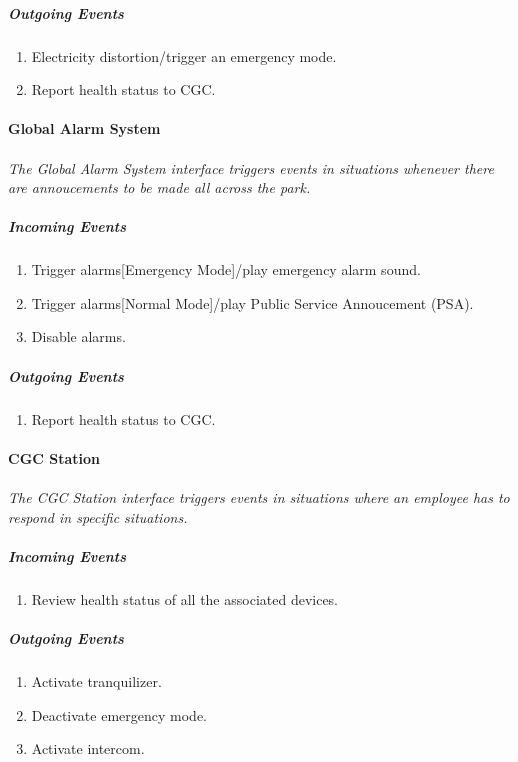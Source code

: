 \documentclass[12pt]{article}
\begin{document}
	    \subparagraph{Outgoing Events}
		\begin{enumerate}
		    \item Electricity distortion/trigger an emergency mode.
		    \item Report health status to CGC. 
		\end{enumerate}

	\paragraph{Global Alarm System}
	\paragraph{}\textit{The Global Alarm System interface triggers events in situations whenever there are annoucements to be made all across the park. }
	    \subparagraph{Incoming Events}
		\begin{enumerate}
			\item Trigger alarms[Emergency Mode]/play emergency alarm sound.
			\item Trigger alarms[Normal Mode]/play Public Service Annoucement (PSA).
			\item Disable alarms.
		\end{enumerate}
				
	    \subparagraph{Outgoing Events}
		\begin{enumerate}
			\item Report health status to CGC.
		\end{enumerate}

	\paragraph{CGC Station}
	\paragraph{}\textit{The CGC Station interface triggers events in situations where an employee has to respond in specific situations. }
	    \subparagraph{Incoming Events}
		\begin{enumerate}
			\item Review health status of all the associated devices.
		\end{enumerate}
				
	    \subparagraph{Outgoing Events}
		\begin{enumerate}
			\item Activate tranquilizer.
			\item Deactivate emergency mode.
			\item Activate intercom. 
		\end{enumerate}
\end{document}
